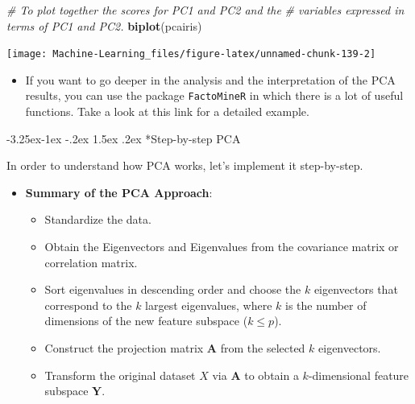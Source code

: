 \documentclass[]{book}
\makeatletter
\newenvironment{Shaded}{\begin{snugshade}}{\end{snugshade}}
\newcommand{\KeywordTok}[1]{\textcolor[rgb]{0.13,0.29,0.53}{\textbf{#1}}}
\newcommand{\CommentTok}[1]{\textcolor[rgb]{0.56,0.35,0.01}{\textit{#1}}}
\newcommand{\NormalTok}[1]{#1}
\providecommand{\tightlist}{%
  \setlength{\itemsep}{0pt}\setlength{\parskip}{0pt}}
\newenvironment{rmdblock}[1]
  {\begin{shaded*}
  \begin{itemize}
  \renewcommand{\labelitemi}{
    \raisebox{-.7\height}[0pt][0pt]{
      {\setkeys{Gin}{width=2em,keepaspectratio}\texttt{[image: img/icons/\#1]}}
    }
  }
  \item
  }
  {
  \end{itemize}
  \end{shaded*}
  }
\newenvironment{rmdinsight}
  {\begin{rmdblock}{insight}}
  {\end{rmdblock}}
\newenvironment{rmdtip}
  {\begin{rmdblock}{tip}}
  {\end{rmdblock}}
\renewcommand\subsection{\@startsection{subsection}{2}{\z@}%
                                     {-3.25ex\@plus -1ex \@minus -.2ex}%
                                     {1.5ex \@plus .2ex}%
                                     {\normalfont\large\bfseries\color{Violet}}}
\theoremstyle{definition}
\theoremstyle{definition}
\theoremstyle{definition}
\theoremstyle{remark}
\makeatother
\begin{document}
\begin{Shaded}
\begin{Highlighting}[]

\CommentTok{# To plot together the scores for PC1 and PC2 and the }
\CommentTok{# variables expressed in terms of PC1 and PC2.}
\KeywordTok{biplot}\NormalTok{(pcairis) }
\end{Highlighting}
\end{Shaded}

\begin{center}\texttt{[image: Machine-Learning\_files/figure-latex/unnamed-chunk-139-2]} \end{center}

\begin{rmdinsight}
If you want to go deeper in the analysis and the interpretation of the
PCA results, you can use the package \texttt{FactoMineR} in which there
is a lot of useful functions. Take a look at this link for a detailed
example.
\end{rmdinsight}

\subsection*{Step-by-step PCA}\label{step-by-step-pca}

In order to understand how PCA works, let's implement it step-by-step.

\begin{rmdtip}
\textbf{Summary of the PCA Approach}:

\begin{itemize}
\tightlist
\item
  Standardize the data.
\item
  Obtain the Eigenvectors and Eigenvalues from the covariance matrix or
  correlation matrix.
\item
  Sort eigenvalues in descending order and choose the \(k\) eigenvectors
  that correspond to the \(k\) largest eigenvalues, where \(k\) is the
  number of dimensions of the new feature subspace (\(k \le p\)).
\item
  Construct the projection matrix \(\mathbf{A}\) from the selected \(k\)
  eigenvectors.
\item
  Transform the original dataset \(X\) via \(\mathbf{A}\) to obtain a
  \(k\)-dimensional feature subspace \(\mathbf{Y}\).
\end{itemize}
\end{rmdtip}
\end{document}
